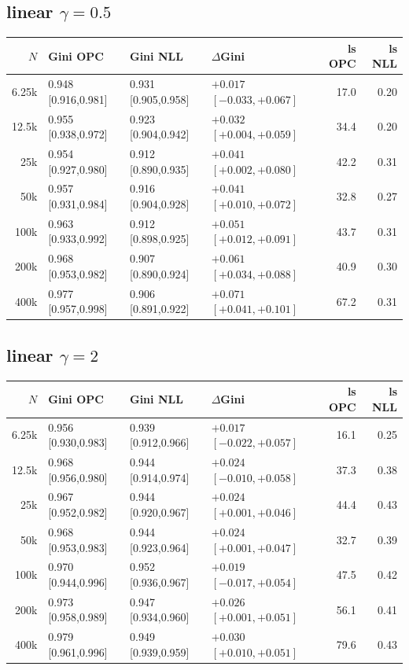 \documentclass[10pt]{article}
\begin{document}
\subsection*{linear $\gamma{=}0.5$}
{\scriptsize
\begin{tabular}{@{}r ll l rr@{}}
\toprule
$N$ & Gini OPC & Gini NLL & $\Delta$Gini & ls OPC & ls NLL \\
\midrule
6.25k & 0.948 [0.916,0.981] & 0.931 [0.905,0.958] & $+0.017$ $[-0.033,+0.067]$ & 17.0 & 0.20 \\
12.5k & 0.955 [0.938,0.972] & 0.923 [0.904,0.942] & $+0.032$ $[+0.004,+0.059]$ & 34.4 & 0.20 \\
25k & 0.954 [0.927,0.980] & 0.912 [0.890,0.935] & $+0.041$ $[+0.002,+0.080]$ & 42.2 & 0.31 \\
50k & 0.957 [0.931,0.984] & 0.916 [0.904,0.928] & $+0.041$ $[+0.010,+0.072]$ & 32.8 & 0.27 \\
100k & 0.963 [0.933,0.992] & 0.912 [0.898,0.925] & $+0.051$ $[+0.012,+0.091]$ & 43.7 & 0.31 \\
200k & 0.968 [0.953,0.982] & 0.907 [0.890,0.924] & $+0.061$ $[+0.034,+0.088]$ & 40.9 & 0.30 \\
400k & 0.977 [0.957,0.998] & 0.906 [0.891,0.922] & $+0.071$ $[+0.041,+0.101]$ & 67.2 & 0.31 \\
\bottomrule
\end{tabular}}

\subsection*{linear $\gamma{=}2$}
{\scriptsize
\begin{tabular}{@{}r ll l rr@{}}
\toprule
$N$ & Gini OPC & Gini NLL & $\Delta$Gini & ls OPC & ls NLL \\
\midrule
6.25k & 0.956 [0.930,0.983] & 0.939 [0.912,0.966] & $+0.017$ $[-0.022,+0.057]$ & 16.1 & 0.25 \\
12.5k & 0.968 [0.956,0.980] & 0.944 [0.914,0.974] & $+0.024$ $[-0.010,+0.058]$ & 37.3 & 0.38 \\
25k & 0.967 [0.952,0.982] & 0.944 [0.920,0.967] & $+0.024$ $[+0.001,+0.046]$ & 44.4 & 0.43 \\
50k & 0.968 [0.953,0.983] & 0.944 [0.923,0.964] & $+0.024$ $[+0.001,+0.047]$ & 32.7 & 0.39 \\
100k & 0.970 [0.944,0.996] & 0.952 [0.936,0.967] & $+0.019$ $[-0.017,+0.054]$ & 47.5 & 0.42 \\
200k & 0.973 [0.958,0.989] & 0.947 [0.934,0.960] & $+0.026$ $[+0.001,+0.051]$ & 56.1 & 0.41 \\
400k & 0.979 [0.961,0.996] & 0.949 [0.939,0.959] & $+0.030$ $[+0.010,+0.051]$ & 79.6 & 0.43 \\
\bottomrule
\end{tabular}}
\end{document}
